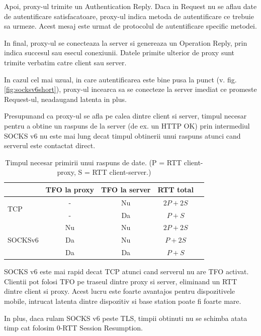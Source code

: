 Apoi, proxy-ul trimite un Authentication Reply. Daca in Request nu se aflau date de autentificare satisfacatoare,
proxy-ul indica metoda de autentificare ce trebuie sa urmeze. Acest mesaj este urmat de protocolul de autentificare 
specific metodei.

In final, proxy-ul se conecteaza la server si genereaza un Operation Reply, prin indica succesul sau esecul conexiunii.
Datele primite ulterior de proxy sunt trimite verbatim catre client sau server.

In cazul cel mai uzual, in care autentificarea este bine pusa la punct (v. fig. \ref{fig:socksv6short}), proxy-ul
incearca sa se conecteze la server imediat ce promeste Request-ul, neadaugand latenta in plus.

Presupunand ca proxy-ul se afla pe calea dintre client si server, timpul necesar pentru a obtine un raspuns de la server
(de ex. un HTTP OK) prin intermediul SOCKS v6 nu este mai lung decat timpul obtinerii unui raspuns atunci cand serverul
este contactat direct.

\begin{table}
	\centering
	\begin{tabular}{| l | c | c | c | r |} \hline
		& TFO la proxy & TFO la server & RTT total \\ \hline
		\multirow{2}{*}{TCP} & - & Nu  & \(2P+2S\) \\ \hhline{~----}
		~ & - & Da  & \(P+S\) \\ \hline
		\multirow{3}{*}{SOCKSv6} & Nu & Nu  & \(2P + 2S\)  \\ \hhline{~----}
		~ & Da & Nu & \(P + 2S\) \\ \hhline{~----}
		~ & Da  & Da & \(P + S\) \\ \hline
	\end{tabular}
  	\caption{Timpul necesar primirii unui raspuns de date. (P = RTT client-proxy, S = RTT client-server.)}
 \end{table}

SOCKS v6 este mai rapid decat TCP atunci cand serverul nu are TFO activat.
Clientii pot folosi TFO pe traseul dintre proxy si server, eliminand un RTT dintre client si proxy.
Acest lucru este foarte avantajos pentru dispozitivele mobile, intrucat latenta dintre dispozitiv si base station
poate fi foarte mare.

In plus, daca rulam SOCKS v6 peste TLS, timpii obtinuti nu se schimba atata timp cat folosim 0-RTT Session Resumption.

